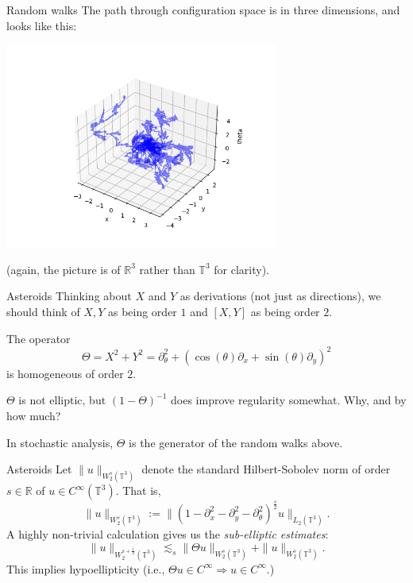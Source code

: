 \documentclass{beamer}
\numberwithin{equation}{section}
\theoremstyle{plain}
\theoremstyle{plain}
\theoremstyle{definition}
\theoremstyle{plain}
\theoremstyle{plain}
\theoremstyle{definition}
\newcommand{\Rl}{\mathbb{R}}
\newcommand{\Circ}{\mathbb{T}}
\begin{document}
\begin{frame}{Random walks}
  The path through configuration space is in three dimensions, and looks like this:
  \begin{center}
  \includegraphics[width=90mm]{xyt_coords_multiple_paths.png}
  \end{center}
  (again, the picture is of $\Rl^3$ rather than $\Circ^3$ for clarity).
\end{frame}

\begin{frame}{Asteroids}
  Thinking about $X$ and $Y$ as derivations (not just as directions), we should think of $X,Y$ as being order $1$ and $[X,Y]$ as being order $2.$

  The operator
  \[
    \Theta = X^2+Y^2 = \partial_\theta^2+(\cos(\theta)\partial_x+\sin(\theta)\partial_y)^2
  \]
  is homogeneous of order $2.$
  \pause
  \begin{center}
      $\Theta$ is not elliptic, but $(1-\Theta)^{-1}$ does improve regularity somewhat. Why, and by how much?
  \end{center}
  \pause
  In stochastic analysis, $\Theta$ is the generator of the random walks above.
\end{frame}

\begin{frame}{Asteroids}
 Let $\|u\|_{W^s_2(\Circ^3)}$ denote the standard Hilbert-Sobolev norm of order $s\in \Rl$ of $u\in C^\infty(\Circ^3).$ That is,
 \[
      \|u\|_{W^s_2(\Circ^3)} := \|(1-\partial_x^2-\partial_y^2-\partial_\theta^2)^{\frac{s}{2}}u\|_{L_2(\Circ^3)}.
 \]
 A highly non-trivial calculation gives us the \emph{sub-elliptic estimates}:
  \[
      \|u\|_{W^{s+\frac12}_2(\Circ^3)}\lesssim_s \|\Theta u\|_{W^s_2(\Circ^3)}+\|u\|_{W^s_2(\Circ^3)}.
  \]
  This implies hypoellipticity (i.e., $\Theta u\in C^\infty \Rightarrow u \in C^\infty$.)
\end{frame}
\end{document}
